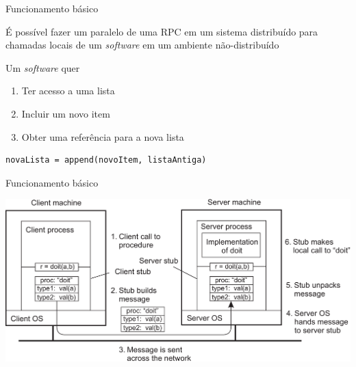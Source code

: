 \documentclass[compress]{beamer}
\begin{document}

\begin{frame}[fragile]{Funcionamento básico}

É possível fazer um paralelo de uma RPC em um sistema distribuído para chamadas locais de um \textit{software} em um ambiente não-distribuído

Um \textit{software} quer 
\begin{enumerate}
    \item Ter acesso a uma lista
    \item Incluir um novo item 
    \item Obter uma referência para a nova lista
\end{enumerate}

\begin{verbatim}
novaLista = append(novoItem, listaAntiga)
\end{verbatim}

\end{frame}


\begin{frame}{Funcionamento básico}

\vspace{0.5cm}

\centering \includegraphics[width=\textwidth]{images/rpc_operation.png}

\end{frame}

\end{document}
